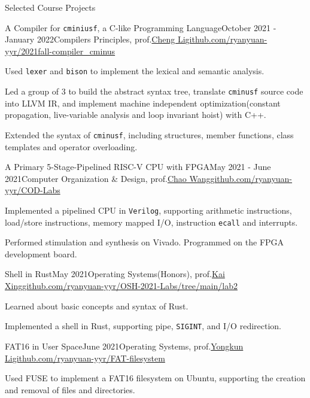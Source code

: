 \documentclass{resume} %
\begin{document}
\begin{rSection}{Selected Course Projects}
    \begin{rSubsection}{A Compiler for \texttt{cminiusf}, a C-like Programming Language}{October 2021 - January 2022}{Compilers Principles, prof.\href{http://staff.ustc.edu.cn/~chengli7/}{Cheng Li}}{\href{https://github.com/ryanyuan-yyr/2021fall-compiler\_cminus}{github.com/ryanyuan-yyr/2021fall-compiler\_cminus}}
        \item Used \texttt{lexer} and \texttt{bison} to implement the lexical and semantic analysis.
        \item Led a group of 3 to build the abstract syntax tree, translate \texttt{cminusf} source code into LLVM IR, and  implement machine independent optimization(constant propagation, live-variable analysis and loop invariant hoist) with C++.
        \item Extended the syntax of \texttt{cminusf}, including structures, member functions, class templates and operator overloading.
    \end{rSubsection}

    \begin{rSubsection}{A Primary 5-Stage-Pipelined RISC-V CPU with FPGA}{May 2021 - June 2021}{Computer Organization \& Design, prof.\href{http://staff.ustc.edu.cn/~cswang/}{Chao Wang}}{\href{https://github.com/ryanyuan-yyr/COD-Labs}{github.com/ryanyuan-yyr/COD-Labs}}
        \item Implemented a pipelined CPU in \texttt{Verilog}, supporting arithmetic instructions, load/store instructions, memory mapped I/O, instruction \texttt{ecall} and interrupts.
        \item Performed stimulation and synthesis on Vivado. Programmed on the FPGA development board.
    \end{rSubsection}

    \begin{rSubsection}{Shell in Rust}{May 2021}{Operating Systems(Honors), prof.\href{http://staff.ustc.edu.cn/~kxing/}{Kai Xing}}{\href{https://github.com/ryanyuan-yyr/OSH-2021-Labs/tree/main/lab2}{github.com/ryanyuan-yyr/OSH-2021-Labs/tree/main/lab2}}
        \item Learned about basic concepts and syntax of Rust.
        \item Implemented a shell in Rust, supporting pipe, \texttt{SIGINT}, and I/O redirection.
    \end{rSubsection}

    \begin{rSubsection}{FAT16 in User Space}{June 2021}{Operating Systems, prof.\href{http://staff.ustc.edu.cn/~ykli/}{Yongkun Li}}{\href{https://github.com/ryanyuan-yyr/FAT-filesystem}{github.com/ryanyuan-yyr/FAT-filesystem}}
        \item Used FUSE to implement a FAT16 filesystem on Ubuntu, supporting the creation and removal of files and directories.
    \end{rSubsection}

\end{rSection}
\end{document}

